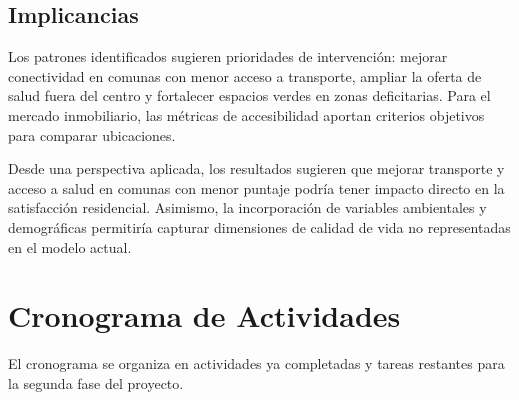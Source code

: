\documentclass[11pt,letterpaper]{article}
\begin{document}
\subsection{Implicancias}
Los patrones identificados sugieren prioridades de intervención: mejorar conectividad en comunas con menor acceso a transporte, ampliar la oferta de salud fuera del centro y fortalecer espacios verdes en zonas deficitarias. Para el mercado inmobiliario, las métricas de accesibilidad aportan criterios objetivos para comparar ubicaciones.

Desde una perspectiva aplicada, los resultados sugieren que mejorar transporte y acceso a salud en comunas con menor puntaje podría tener impacto directo en la satisfacción residencial. Asimismo, la incorporación de variables ambientales y demográficas permitiría capturar dimensiones de calidad de vida no representadas en el modelo actual.
\section{Cronograma de Actividades}

El cronograma se organiza en actividades ya completadas y tareas restantes para la segunda fase del proyecto.
\end{document}
